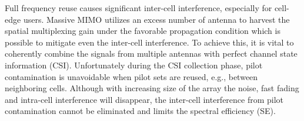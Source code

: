 Full frequency reuse causes significant inter-cell interference, especially for cell-edge users. Massive MIMO utilizes an excess number of antenna to harvest the spatial multiplexing gain under the favorable propagation condition \cite{ngo2014aspects} which is possible to mitigate even the inter-cell interference. %
To achieve this, it is vital to coherently combine the signals from multiple antennas with perfect channel state information (CSI). Unfortunately during the CSI collection phase, pilot contamination is unavoidable when pilot sets are reused, e.g., between neighboring cells. Although with increasing size of the array the %
noise, fast fading and intra-cell interference will disappear, %
the inter-cell interference from pilot contamination cannot be eliminated and limits the spectral efficiency (SE)\cite{marzetta2010noncooperative,bjornson2017massive,jose2011pilot}.


